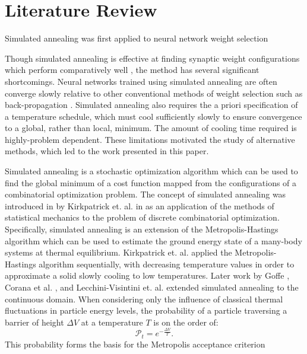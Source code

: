 \documentclass[10pt,journal,cspaper,compsoc]{IEEEtran}
\begin{document}
\section{Literature Review}
\label{scn:lit_review}
Simulated annealing was first applied to neural network weight selection 


Though simulated annealing is effective at finding synaptic weight configurations which perform comparatively well \cite{}, the method has several significant shortcomings. Neural networks trained using simulated annealing are often converge slowly relative to other conventional methods of weight selection such as back-propagation \cite{}. Simulated annealing also requires the a priori specification of a temperature schedule, which must cool sufficiently slowly to ensure convergence to a global, rather than local, minimum. The amount of cooling time required is highly-problem dependent. These limitations motivated the study of alternative methods, which led to the work presented in this paper.


Simulated annealing is a stochastic optimization algorithm which can be used to find the global minimum of a cost function mapped from the configurations of a combinatorial optimization problem. The concept of simulated annealing was introduced in by Kirkpatrick et. al. in \cite{kirkpatrick1983} as an application of the methods of statistical mechanics to the problem of discrete combinatorial optimization. Specifically, simulated annealing is an extension of the Metropolis-Hastings \cite{metropolis1953} algorithm which can be used to estimate the ground energy state of a many-body systems at thermal equilibrium. Kirkpatrick et. al. applied the Metropolis-Hastings algorithm sequentially, with decreasing temperature values in order to approximate a solid slowly cooling to low temperatures. Later work by Goffe \cite{goffe1994globaloptimization}, Corana et al. \cite{corana1987minimizingmultimodal}, and Lecchini-Visintini et. al. \cite{lecchinivisintini2007sacontinuousgaruntees} extended simulated annealing to the continuous domain. 
When considering only the influence of classical thermal fluctuations in particle energy levels, the probability of a particle traversing a barrier of height \begin{math} \Delta V \end{math} at a temperature \begin{math} T \end{math} is on the order of: \begin{equation} \label{eq:thermal_transistion_prob}
\mathcal{P}_t = e^{-\frac{\Delta V}{T}}.
\end{equation}
This probability forms the basis for the Metropolis acceptance criterion
\end{document}
